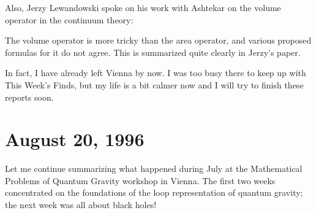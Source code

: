 \documentclass{article}
\renewcommand{\texttt}[1]{%
  \begingroup
  \ttfamily
  \begingroup\lccode`~=`/\lowercase{\endgroup\def~}{/\discretionary{}{}{}}%
  \begingroup\lccode`~=`[\lowercase{\endgroup\def~}{[\discretionary{}{}{}}%
  \begingroup\lccode`~=`.\lowercase{\endgroup\def~}{.\discretionary{}{}{}}%
  \catcode`/=\active\catcode`[=\active\catcode`.=\active
  \scantokens{#1\noexpand}%
  \endgroup
}
\begin{document}
\begin{itemize}

  Also, Jerzy Lewandowski spoke on his work with Ashtekar on the volume
  operator in the continuum theory:


  The volume operator is more tricky than the area operator, and various
  proposed formulas for it do not agree. This is summarized quite
  clearly in Jerzy's paper.

  In fact, I have already left Vienna by now. I was too busy there to
  keep up with This Week's Finds, but my life is a bit calmer now and I
  will try to finish these reports soon.
\end{itemize}



\hypertarget{week87}{%
\section{August 20, 1996}\label{week87}}

Let me continue summarizing what happened during July at the
Mathematical Problems of Quantum Gravity workshop in Vienna. The first
two weeks concentrated on the foundations of the loop representation of
quantum gravity; the next week was all about black holes!
\end{document}
